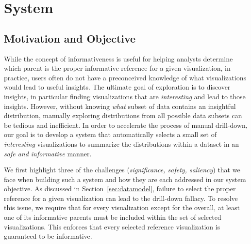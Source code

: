 \section{System\label{sec:system}}
\subsection{Motivation and Objective}
While the concept of informativeness is useful for helping analysts determine which parent is the proper informative reference for a given visualization, in practice, users often do not have a preconceived knowledge of what visualizations would lead to useful insights. The ultimate goal of exploration is to discover insights, in particular finding visualizations that are \textit{interesting} and lead to those insights. %
However, without knowing \textit{what} subset of data contains an insightful distribution, manually exploring distributions from all possible data subsets can be tedious and inefficient. In order to accelerate the process of manual drill-down, our goal is to develop a system that automatically selects a small set of \textit{interesting} visualizations to summarize the distributions within a dataset in an \textit{safe and informative} manner.
\par We first highlight three of the challenges (\textit{significance, safety, saliency}) that we face when building such a system and how they are each addressed in our system objective.
 As discussed in Section~\ref{sec:datamodel}, failure to select the proper reference for a given visualization can lead to the drill-down fallacy. To resolve this issue, we require that for every visualization except for the overall, at least one of its informative parents must be included within the set of selected visualizations. This enforces that every selected reference visualization is guaranteed to be informative. %
